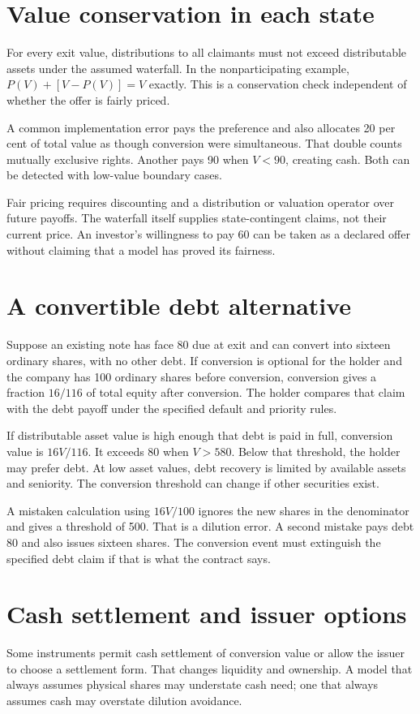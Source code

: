 \section{Value conservation in each state}
For every exit value, distributions to all claimants must not exceed distributable assets under the assumed waterfall. In the nonparticipating example, $P(V)+[V-P(V)]=V$ exactly. This is a conservation check independent of whether the offer is fairly priced.

A common implementation error pays the preference and also allocates 20 per cent of total value as though conversion were simultaneous. That double counts mutually exclusive rights. Another pays 90 when $V<90$, creating cash. Both can be detected with low-value boundary cases.

Fair pricing requires discounting and a distribution or valuation operator over future payoffs. The waterfall itself supplies state-contingent claims, not their current price. An investor's willingness to pay 60 can be taken as a declared offer without claiming that a model has proved its fairness.

\section{A convertible debt alternative}
Suppose an existing note has face 80 due at exit and can convert into sixteen ordinary shares, with no other debt. If conversion is optional for the holder and the company has 100 ordinary shares before conversion, conversion gives a fraction $16/116$ of total equity after conversion. The holder compares that claim with the debt payoff under the specified default and priority rules.

If distributable asset value is high enough that debt is paid in full, conversion value is $16V/116$. It exceeds 80 when $V>580$. Below that threshold, the holder may prefer debt. At low asset values, debt recovery is limited by available assets and seniority. The conversion threshold can change if other securities exist.

A mistaken calculation using $16V/100$ ignores the new shares in the denominator and gives a threshold of 500. That is a dilution error. A second mistake pays debt 80 and also issues sixteen shares. The conversion event must extinguish the specified debt claim if that is what the contract says.

\section{Cash settlement and issuer options}
Some instruments permit cash settlement of conversion value or allow the issuer to choose a settlement form. That changes liquidity and ownership. A model that always assumes physical shares may understate cash need; one that always assumes cash may overstate dilution avoidance.


